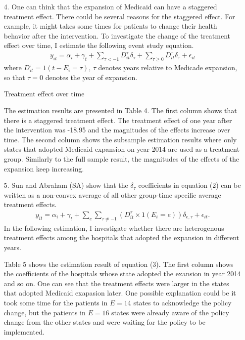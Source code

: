 \documentclass[12pt]{article}
\begin{document}
\begin{itemize}
		\item[4.] One can think that the expansion of Medicaid can have a staggered treatment effect. There could be several reasons for the staggered effect. For example, it might takes some times for patients to change their health behavior after the intervention. To investigate the change of the treatment effect over time, I estimate the following event study equation.
		\begin{eqnarray}
			y_{it} = \alpha_i + \gamma_t + \sum_{\tau < -1} D_{it}^{\tau} \delta_{\tau} + \sum_{\tau \ge 0} D_{it}^{\tau} \delta_{\tau} + \epsilon_{it}
		\end{eqnarray}
	    where $D_{it}^{\tau} = 1(t-E_i = \tau)$, $\tau$ denotes years relative to Medicade expansion, so that $\tau = 0$ denotes the year of expansion.
	    
	    \begin{footnotesize}
	    	\begin{table}
	    
	    \caption{Treatment effect over time}
	    	\end{table}

	    \end{footnotesize}
    
        The estimation results are presented in Table 4. The first column shows that there is a staggered treatment effect. The treatment effect of one year after the intervention was -18.95 and the magnitudes of the effects increase over time.
        The second column shows the subsample estimation results where only states that adopted Medicaid expansion on year 2014 are used as a treatment group. Similarly to the full sample result, the magnitudes of the effects of the expansion keep increasing.
		
		\item[5.] Sun and Abraham (SA) show that the $\delta_{\tau}$ coefficients in equation (2) can be written as a non-convex average of all other group-time specific average treatment effects.
		\begin{eqnarray}
			y_{it} = \alpha_i + \gamma_t + \sum_e \sum_{\tau \neq -1} (D_{it}^{\tau} \times 1(E_i=e)) \delta_{e,\tau} + \epsilon_{it}.
		\end{eqnarray}
		In the following estimation, I investigate whether there are heterogenous treatment effects among the hospitals that adopted the expansion in different years.
		
		
		
		Table 5 shows the estimation result of equation (3). The first column shows the coefficients of the hospitals whose state adopted the exansion in year 2014 and so on. One can see that the treatment effects were larger in the states that adopted Medicaid exapasion later. One possible explanation could be it took some time for the patients in $E=14$ states to acknowledge the policy change, but the patients in $E=16$ states were already aware of the policy change from the other states and were waiting for the policy to be implemented.
		

\end{itemize}
\end{document}

